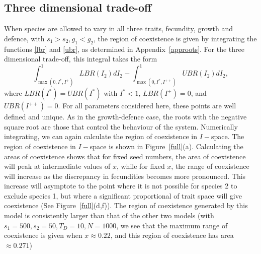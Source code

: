 \subsection{Three dimensional trade-off}
When species are allowed to vary in all three traits, fecundity, growth and defence, with $s_1>s_2,g_1<g_2$, the region of coexistence is given by integrating the functions \eqref{lbr} and \eqref{ubr}, as determined in Appendix~\ref{approots}. For the three dimensional trade-off, this integral takes the form
\begin{equation}
\int_{\max(0,I^*,I^+)}^1 LBR(I_2)dI_2 - \int_{\max(0,I^*,I^{++})}^1 UBR(I_2)dI_2,
\end{equation}
where $LBR(I^*)=UBR(I^*)$ with $I^*<1$, $LBR(I^+)=0$, and $UBR(I^{++})=0$. For all parameters considered here, these points are well defined and unique. As in the growth-defence case, the roots with the negative square root are those that control the behaviour of the system. Numerically integrating, we can again calculate the region of coexistence in $I-$space. The region of coexistence in $I-$space is shown in Figure~\ref{full}(a). Calculating the areas of coexistence shows that for fixed seed numbers, the area of coexistence will peak at intermediate values of $x$, while for fixed $x$, the range of coexistence will increase as the discrepancy in fecundities becomes more pronounced. This increase will asymptote to the point where it is not possible for species 2 to exclude species 1, but where a significant proportional of trait space will give coexistence (See Figure~\ref{full}(d,f)). The region of coexistence generated by this model is consistently larger than that of the other two models (with $s_1=500,s_2=50,T_D=10,N=1000$, we see that the maximum range of coexistence is given when $x\approx 0.22$, and this region of coexistence has area $\approx 0.271$)
